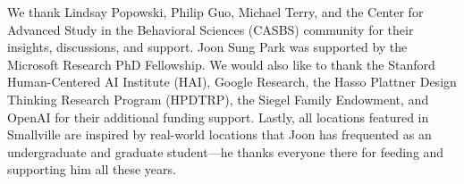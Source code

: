 \begin{acks}
We thank Lindsay Popowski, Philip Guo, Michael Terry, and the Center for Advanced Study in the Behavioral Sciences (CASBS) community for their insights, discussions, and support. Joon Sung Park was supported by the Microsoft Research PhD Fellowship. We would also like to thank the Stanford Human-Centered AI Institute (HAI), Google Research, the Hasso Plattner Design Thinking Research Program (HPDTRP), the Siegel Family Endowment, and OpenAI for their additional funding support. Lastly, all locations featured in Smallville are inspired by real-world locations that Joon has frequented as an undergraduate and graduate student---he thanks everyone there for feeding and supporting him all these years. 
\end{acks}


